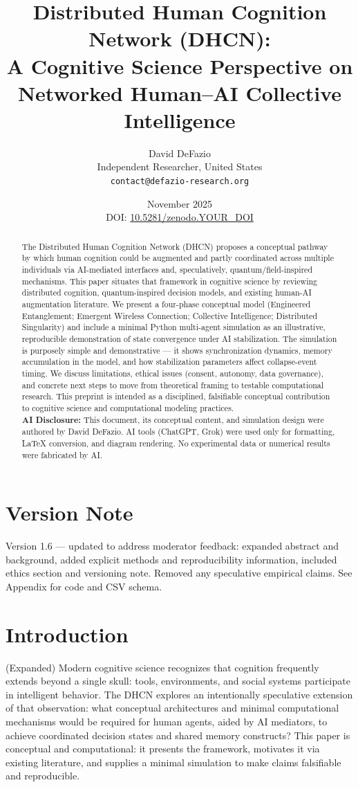\documentclass[12pt]{article}
\title{\textbf{Distributed Human Cognition Network (DHCN):} \\ A Cognitive Science Perspective on Networked Human--AI Collective Intelligence}
\author{David DeFazio \\ Independent Researcher, United States \\ \texttt{contact@defazio-research.org}}
\date{November 2025 \\ DOI: \href{https://doi.org/10.5281/zenodo.YOUR_DOI}{10.5281/zenodo.YOUR_DOI}}
\begin{document}
\maketitle

\begin{abstract}
The Distributed Human Cognition Network (DHCN) proposes a conceptual pathway by which human cognition could be augmented and partly coordinated across multiple individuals via AI-mediated interfaces and, speculatively, quantum/field-inspired mechanisms. This paper situates that framework in cognitive science by reviewing distributed cognition, quantum-inspired decision models, and existing human-AI augmentation literature. We present a four-phase conceptual model (Engineered Entanglement; Emergent Wireless Connection; Collective Intelligence; Distributed Singularity) and include a minimal Python multi-agent simulation as an illustrative, reproducible demonstration of state convergence under AI stabilization. The simulation is purposely simple and demonstrative — it shows synchronization dynamics, memory accumulation in the model, and how stabilization parameters affect collapse-event timing. We discuss limitations, ethical issues (consent, autonomy, data governance), and concrete next steps to move from theoretical framing to testable computational research. This preprint is intended as a disciplined, falsifiable conceptual contribution to cognitive science and computational modeling practices.
\\[6pt]
\textbf{AI Disclosure:} This document, its conceptual content, and simulation design were authored by David DeFazio. AI tools (ChatGPT, Grok) were used only for formatting, LaTeX conversion, and diagram rendering. No experimental data or numerical results were fabricated by AI.
\end{abstract}

\section*{Version Note}
Version 1.6 — updated to address moderator feedback: expanded abstract and background, added explicit methods and reproducibility information, included ethics section and versioning note. Removed any speculative empirical claims. See Appendix for code and CSV schema.

\tableofcontents
\newpage

\section{Introduction}
(Expanded) Modern cognitive science recognizes that cognition frequently extends beyond a single skull: tools, environments, and social systems participate in intelligent behavior. The DHCN explores an intentionally speculative extension of that observation: what conceptual architectures and minimal computational mechanisms would be required for human agents, aided by AI mediators, to achieve coordinated decision states and shared memory constructs? This paper is conceptual and computational: it presents the framework, motivates it via existing literature, and supplies a minimal simulation to make claims falsifiable and reproducible.
\end{document}
